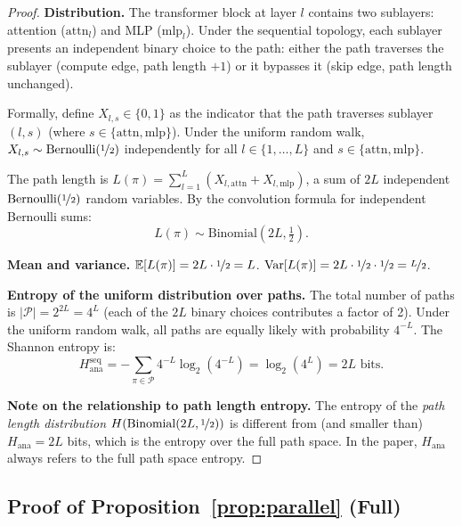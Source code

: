 \documentclass{article}
\newcommand{\E}{\mathbb{E}}
\newcommand{\Pcal}{\mathcal{P}}
\newcommand{\Hana}{H_{\mathrm{ana}}}
\newcommand{\attn}{\mathrm{attn}}
\newcommand{\mlp}{\mathrm{mlp}}
\begin{document}
\begin{proof}
\textbf{Distribution.}
The transformer block at layer $l$ contains two sublayers: attention ($\mathrm{attn}_l$) and MLP ($\mathrm{mlp}_l$).
Under the sequential topology, each sublayer presents an independent binary choice to the path:
either the path traverses the sublayer (compute edge, path length $+1$) or it bypasses it
(skip edge, path length unchanged).

Formally, define $X_{l,s} \in \{0,1\}$ as the indicator that the path traverses
sublayer $(l, s)$ (where $s \in \{\attn, \mlp\}$).
Under the uniform random walk, $X_{l,s} \sim \mathrm{Bernoulli}(\nicefrac{1}{2})$
independently for all $l \in \{1,\ldots,L\}$ and $s \in \{\attn, \mlp\}$.

The path length is $L(\pi) = \sum_{l=1}^{L} (X_{l,\attn} + X_{l,\mlp})$,
a sum of $2L$ independent $\mathrm{Bernoulli}(\nicefrac{1}{2})$ random variables.
By the convolution formula for independent Bernoulli sums:
\[
  L(\pi) \sim \mathrm{Binomial}(2L, \tfrac{1}{2}).
\]

\textbf{Mean and variance.}
$\E[L(\pi)] = 2L \cdot \nicefrac{1}{2} = L$.
$\mathrm{Var}[L(\pi)] = 2L \cdot \nicefrac{1}{2} \cdot \nicefrac{1}{2} = \nicefrac{L}{2}$.

\textbf{Entropy of the uniform distribution over paths.}
The total number of paths is $|\Pcal| = 2^{2L} = 4^L$ (each of the $2L$ binary choices
contributes a factor of 2).  Under the uniform random walk, all paths are equally
likely with probability $4^{-L}$.  The Shannon entropy is:
\[
  \Hana^{\mathrm{seq}} = -\sum_{\pi \in \Pcal} 4^{-L} \log_2(4^{-L}) = \log_2(4^L) = 2L \text{ bits.}
\]

\textbf{Note on the relationship to path length entropy.}
The entropy of the \emph{path length distribution} $H(\mathrm{Binomial}(2L,\nicefrac{1}{2}))$
is different from (and smaller than) $\Hana = 2L$ bits, which is the entropy over
the full path space.  In the paper, $\Hana$ always refers to the full path space entropy.
\end{proof}

\subsection{Proof of Proposition~\ref{prop:parallel} (Full)}
\end{document}
